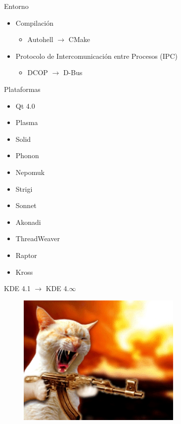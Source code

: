 \documentclass[12pt]{beamer}
\begin{document}
\begin{frame}{Entorno}
    \begin{itemize}
        \item Compilación
        \begin{itemize}
            \item Autohell $\rightarrow$ CMake
        \end{itemize}
        \bigskip
        \item Protocolo de Intercomunicación entre Procesos (IPC)
        \begin{itemize}
            \item DCOP $\rightarrow$ D-Bus
        \end{itemize}
    \end{itemize}
\end{frame}

\begin{frame}{Plataformas}
    \begin{itemize}
        \item Qt 4.0
        \item Plasma
        \item Solid
        \item Phonon
        \item Nepomuk
        \item Strigi
        \item Sonnet
        \item Akonadi
        \item ThreadWeaver
        \item Raptor
        \item Kross
    \end{itemize}
\end{frame}

\begin{frame}{KDE 4.1 $\rightarrow$ KDE 4.$\infty$}
    \center
    \begin{figure}
        \includegraphics[width=8cm]{cat.jpg}
    \end{figure}
\end{frame}
\end{document}
